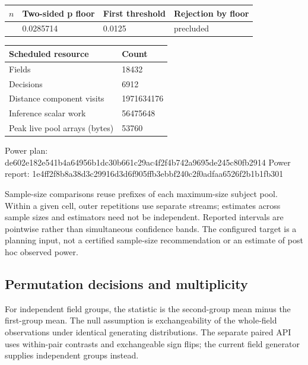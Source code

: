\documentclass[
  english,
  11pt,
]{article}
\newenvironment{Shaded}{}{}
\newcommand{\NormalTok}[1]{#1}
\newcounter{none} %
\begin{document}
{\def\LTcaptype{none} %
\begin{longtable}[]{@{}llll@{}}
\toprule\noalign{}
\(n\) & Two-sided p floor & First threshold & Rejection by floor \\
\midrule\noalign{}
\endhead
\bottomrule\noalign{}
\endlastfoot
4 & 0.0285714 & 0.0125 & precluded \\
\end{longtable}
}

{\def\LTcaptype{none} %
\begin{longtable}[]{@{}ll@{}}
\toprule\noalign{}
Scheduled resource & Count \\
\midrule\noalign{}
\endhead
\bottomrule\noalign{}
\endlastfoot
Fields & 18432 \\
Decisions & 6912 \\
Distance component visits & 1971634176 \\
Inference scalar work & 56475648 \\
Peak live pool arrays (bytes) & 53760 \\
\end{longtable}
}

\begingroup\small

\begin{Shaded}
\begin{Highlighting}[]
\NormalTok{Power plan:   de602e182e541b4a64956b1dc30b661c29ac4f2f4b742a9695de245c80fb2914}
\NormalTok{Power report: 1e4ff2f8b8a38d3c29916d3d6f905ffb3ebbf240c2f0adfaa6526f2b1b1fb301}
\end{Highlighting}
\end{Shaded}

\endgroup

Sample-size comparisons reuse prefixes of each maximum-size subject
pool. Within a given cell, outer repetitions use separate streams;
estimates across sample sizes and estimators need not be independent.
Reported intervals are pointwise rather than simultaneous confidence
bands. The configured target is a planning input, not a certified
sample-size recommendation or an estimate of post hoc observed power.

\subsection{Permutation decisions and
multiplicity}\label{permutation-decisions-and-multiplicity}

For independent field groups, the statistic is the second-group mean
minus the first-group mean. The null assumption is exchangeability of
the whole-field observations under identical generating distributions.
The separate paired API uses within-pair contrasts and exchangeable sign
flips; the current field generator supplies independent groups instead.
\end{document}
